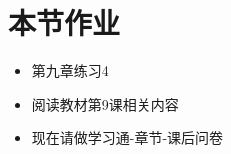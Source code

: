 \documentclass[17pt]{beamer}
\begin{document}
\section{本节作业}

\begin{frame}{\insertsection }
  \begin{itemize}
    \item
      第九章练习4
    \item
      阅读教材第9课相关内容
    \bigskip
    \item
      现在请做学习通\nobreakdash-章节\nobreakdash-课后问卷
  \end{itemize}
\end{frame}  
\end{document}
